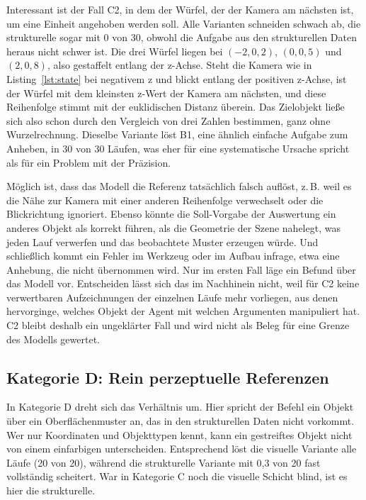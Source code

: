 Interessant ist der Fall C2, in dem der Würfel, der der Kamera am nächsten ist, um eine Einheit angehoben werden soll.
Alle Varianten schneiden schwach ab, die strukturelle sogar mit 0 von 30, obwohl die Aufgabe aus den strukturellen Daten heraus nicht schwer ist.
Die drei Würfel liegen bei $(-2,0,2)$, $(0,0,5)$ und $(2,0,8)$, also gestaffelt entlang der z-Achse.
Steht die Kamera wie in Listing~\ref{lst:state} bei negativem z und blickt entlang der positiven z-Achse, ist der Würfel mit dem kleinsten z-Wert der Kamera am nächsten, und diese Reihenfolge stimmt mit der euklidischen Distanz überein.
Das Zielobjekt ließe sich also schon durch den Vergleich von drei Zahlen bestimmen, ganz ohne Wurzelrechnung.
Dieselbe Variante löst B1, eine ähnlich einfache Aufgabe zum Anheben, in 30 von 30 Läufen, was eher für eine systematische Ursache spricht als für ein Problem mit der Präzision.

Möglich ist, dass das Modell die Referenz tatsächlich falsch auflöst, z.\,B. weil es die Nähe zur Kamera mit einer anderen Reihenfolge verwechselt oder die Blickrichtung ignoriert.
Ebenso könnte die Soll-Vorgabe der Auswertung ein anderes Objekt als korrekt führen, als die Geometrie der Szene nahelegt, was jeden Lauf verwerfen und das beobachtete Muster erzeugen würde.
Und schließlich kommt ein Fehler im Werkzeug oder im Aufbau infrage, etwa eine Anhebung, die nicht übernommen wird.
Nur im ersten Fall läge ein Befund über das Modell vor.
Entscheiden lässt sich das im Nachhinein nicht, weil für C2 keine verwertbaren Aufzeichnungen der einzelnen Läufe mehr vorliegen, aus denen hervorginge, welches Objekt der Agent mit welchen Argumenten manipuliert hat.
C2 bleibt deshalb ein ungeklärter Fall und wird nicht als Beleg für eine Grenze des Modells gewertet.

\subsection*{Kategorie D: Rein perzeptuelle Referenzen}

In Kategorie D dreht sich das Verhältnis um.
Hier spricht der Befehl ein Objekt über ein Oberflächenmuster an, das in den strukturellen Daten nicht vorkommt.
Wer nur Koordinaten und Objekttypen kennt, kann ein gestreiftes Objekt nicht von einem einfarbigen unterscheiden.
Entsprechend löst die visuelle Variante alle Läufe (20 von 20), während die strukturelle Variante mit 0,3 von 20 fast vollständig scheitert.
War in Kategorie C noch die visuelle Schicht blind, ist es hier die strukturelle.

